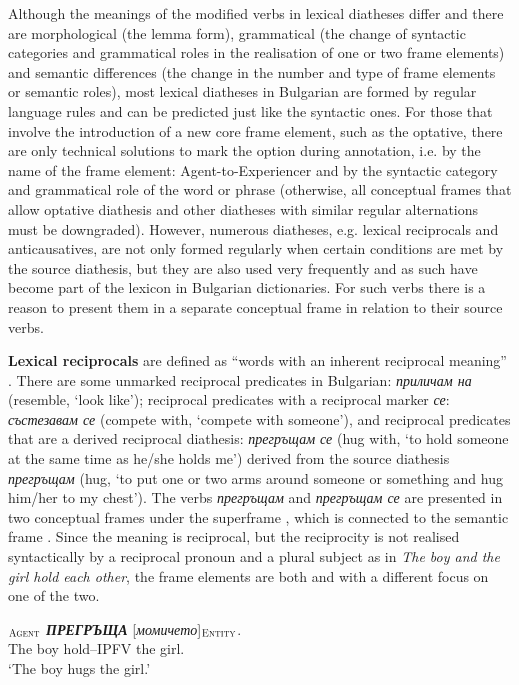 \documentclass[output=paper,colorlinks,citecolor=brown]{langscibook}
\begin{document}
Although the meanings of the modified verbs in lexical diatheses differ and there are morphological (the lemma form), grammatical (the change of syntactic categories and grammatical roles in the realisation of one or two frame elements) and semantic differences (the change in the number and type of frame elements or semantic roles), most lexical diatheses in Bulgarian are formed by regular language rules and can be predicted just like the syntactic ones. For those that involve the introduction of a new core frame element, such as the optative, there are only technical solutions to mark the option during annotation, i.e. by the name of the frame element: Agent-to-Experiencer and by the syntactic category and grammatical role of the word or phrase (otherwise, all conceptual frames that allow optative diathesis and other diatheses with similar regular alternations must be downgraded). However, numerous diatheses, e.g. lexical reciprocals and anticausatives, are not only formed regularly when certain conditions are met by the source diathesis, but they are also used very frequently and as such have become part of the lexicon in Bulgarian dictionaries. For such verbs there is a reason to present them in a separate conceptual frame in relation to their source verbs.

\textbf{Lexical reciprocals} are defined as ``words with an inherent reciprocal meaning'' \citep[14]{Nedjalkov2007}. There are some unmarked reciprocal predicates in Bulgarian: \textit{приличам на} (resemble, `look like'); reciprocal predicates with a reciprocal marker \textit{се}: \textit{състезавам се} (compete with, `compete with someone'), and reciprocal predicates that are a derived reciprocal diathesis: \textit{прегръщам се} (hug with, `to hold someone at the same time as he/she holds me') derived from the source diathesis \textit{прегръщам} (hug, `to put one or two arms around someone or something and hug him/her to my chest'). The verbs \textit{прегръщам} and \textit{прегръщам се} are presented in two conceptual frames under the superframe , which is connected to the semantic frame . Since the meaning is reciprocal, but the reciprocity is not realised syntactically by a reciprocal pronoun and a plural subject as in \textit{The boy and the girl hold each other}, the frame elements are both  and  with a different focus on one of the two.

\begin{exe}
 \ex  \label{ch01:ex:11}
 $_{\text{\textsc{Agent}}}$   \textit{\textbf{ПРЕГРЪЩА}}  [\textit{момичето}]$_{\text{\textsc{Entity}}}$.\\
{The boy}  hold--IPFV {the girl}. \\
 \glt `The boy hugs the girl.' 
 \end{exe}
\end{document}
